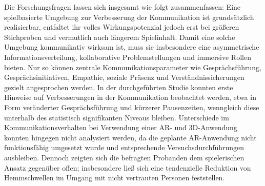 
Die Forschungsfragen lassen sich insgesamt wie folgt zusammenfassen:
Eine spielbasierte Umgebung zur Verbesserung der Kommunikation ist grundsätzlich realisierbar, entfaltet ihr volles Wirkungspotenzial jedoch erst bei größeren Stichproben und vermutlich auch längerem Spielinhalt. Damit eine solche Umgebung kommunikativ wirksam ist, muss sie insbesondere eine asymmetrische Informationsverteilung, kollaborative Problemstellungen und immersive Rollen bieten. Nur so können zentrale Kommunikationsparameter wie Gesprächsführung, Gesprächsinitiativen, Empathie, soziale Präsenz und Verständnissicherungen gezielt angesprochen werden. In der durchgeführten Studie konnten erste Hinweise auf Verbesserungen in der Kommunikation beobachtet werden, etwa in Form veränderter Gesprächsführung und kürzerer Pausenzeiten, wenngleich diese unterhalb des statistisch signifikanten Niveaus bleiben. Unterschiede im Kommunikationsverhalten bei Verwendung einer \ac{AR}- und \ac{3D}-Anwendung konnten hingegen nicht analysiert werden, da die geplante AR-Anwendung nicht funktionsfähig umgesetzt wurde und entsprechende Versuchsdurchführungen ausbleiben. Dennoch zeigten sich die befragten Probanden dem spielerischen Ansatz gegenüber offen; insbesondere ließ sich eine tendenzielle Reduktion von Hemmschwellen im Umgang mit nicht vertrauten Personen feststellen.